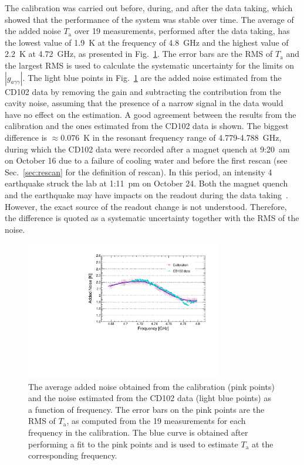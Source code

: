 \documentclass[%
reprint, %
superscriptaddress,
 amsmath,amssymb,
 aps
]{revtex4-2}
\begin{document}
The calibration was carried out before, during, and after the data taking, 
which showed that the performance of the system was stable over time. The 
average of the added noise $T_\text{a}$ over 19 measurements, performed after 
the data taking, has the lowest 
value of 1.9~K at the frequency of 4.8~GHz and the highest value of 
2.2~K at 4.72~GHz, as presented in Fig.~\ref{fig:hemtcalvsf}. 
The error bars are the RMS of $T_\text{a}$ and the largest RMS is used to 
calculate the systematic uncertainty for the limits on 
$\left|g_{a\gamma\gamma}\right|$. The light blue points in 
Fig.~\ref{fig:hemtcalvsf} are the added noise estimated from the CD102 data by 
removing the gain and subtracting the contribution from the cavity noise, 
assuming 
that the presence of a narrow signal in the data would have no effect on the 
estimation. A good agreement between the results from the calibration  
and the ones estimated from the CD102 data is shown. %
The biggest difference is $\approx0.076$~K in the resonant frequency range 
of 4.779-4.788~GHz, %
during which the CD102 data were recorded after a magnet quench at 9:20~am
on October 16 due to a failure of cooling water and before the first rescan 
(see Sec.~\ref{sec:rescan} for the definition of rescan). In this 
period, an intensity 4 earthquake struck the lab at 1:11~pm on October 24. 
Both the magnet quench and the earthquake may have impacts on the readout 
during the data taking~\cite{TASEHInstrumentation}. 
However, the exact source of the readout change is not understood. 
Therefore, the difference is quoted as a systematic uncertainty together 
with the RMS of the noise.

\begin{figure} [htbp]
  \centering
  \includegraphics[width=8.6cm]{Figure1.pdf}
  \caption{The average added noise obtained from the calibration (pink points)
 and the noise estimated from the CD102 data (light blue points) as a 
function of frequency. The error bars on the pink points are the RMS 
of $T_\text{a}$, as computed from the 19 measurements for each frequency 
in the calibration. 
The blue curve is obtained after performing a fit to 
the pink points and is used to estimate $T_\text{a}$ at the corresponding 
frequency.}
  \label{fig:hemtcalvsf}
\end{figure}
\end{document}
